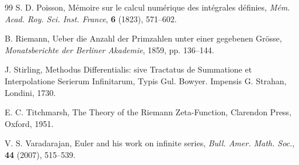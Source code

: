 \documentclass[reqno]{amsart}
\numberwithin{equation}{section}
\begin{document}
\begin{thebibliography}{99}
 S. D. Poisson,  M\'{e}moire sur le calcul num\'{e}rique des int\'{e}grales d\'{e}finies, \emph{M\'{e}m. Acad. Roy. Sci. Inst. France}, \textbf{6} (1823), 571--602.

 B. Riemann, Ueber die Anzahl der Primzahlen unter einer gegebenen Gr\"{o}sse, \emph{Monatsberichte der Berliner Akademie}, 1859, pp. 136--144.

 J. Stirling, Methodus Differentialis: sive Tractatus de Summatione et Interpolatione Serierum Infinitarum, Typis Gul. Bowyer. Impensis G. Strahan, Londini, 1730.

 E. C. Titchmarsh, The Theory of the Riemann Zeta-Function, Clarendon Press, Oxford, 1951.

 V. S. Varadarajan, Euler and his work on infinite series, \emph{Bull. Amer. Math. Soc.}, \textbf{44} (2007), 515--539.

\end{thebibliography}
\end{document}
